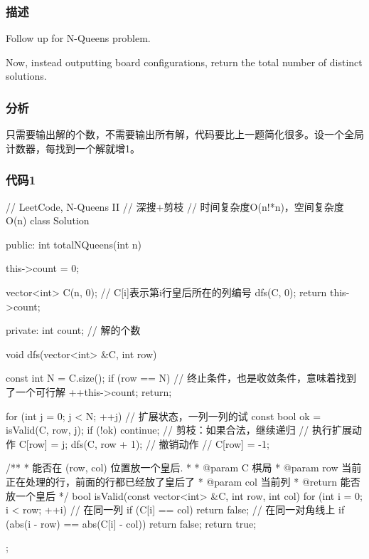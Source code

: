 \subsubsection{描述}
Follow up for N-Queens problem.

Now, instead outputting board configurations, return the total number of distinct solutions.


\subsubsection{分析}
只需要输出解的个数，不需要输出所有解，代码要比上一题简化很多。设一个全局计数器，每找到一个解就增1。


\subsubsection{代码1}
\begin{Code}
// LeetCode, N-Queens II
// 深搜+剪枝
// 时间复杂度O(n!*n)，空间复杂度O(n)
class Solution {
public:
    int totalNQueens(int n) {
        this->count = 0;

        vector<int> C(n, 0);  // C[i]表示第i行皇后所在的列编号
        dfs(C, 0);
        return this->count;
    }
private:
    int count; // 解的个数

    void dfs(vector<int> &C, int row) {
        const int N = C.size();
        if (row == N) { // 终止条件，也是收敛条件，意味着找到了一个可行解
            ++this->count;
            return;
        }

        for (int j = 0; j < N; ++j) {  // 扩展状态，一列一列的试
            const bool ok = isValid(C, row, j);
            if (!ok) continue;  // 剪枝：如果合法，继续递归
            // 执行扩展动作
            C[row] = j;
            dfs(C, row + 1);
            // 撤销动作
            // C[row] = -1;
        }
    }
    /**
     * 能否在 (row, col) 位置放一个皇后.
     *
     * @param C 棋局
     * @param row 当前正在处理的行，前面的行都已经放了皇后了
     * @param col 当前列
     * @return 能否放一个皇后
     */
    bool isValid(const vector<int> &C, int row, int col) {
        for (int i = 0; i < row; ++i) {
            // 在同一列
            if (C[i] == col) return false;
            // 在同一对角线上
            if (abs(i - row) == abs(C[i] - col)) return false;
        }
        return true;
    }
};
\end{Code}


